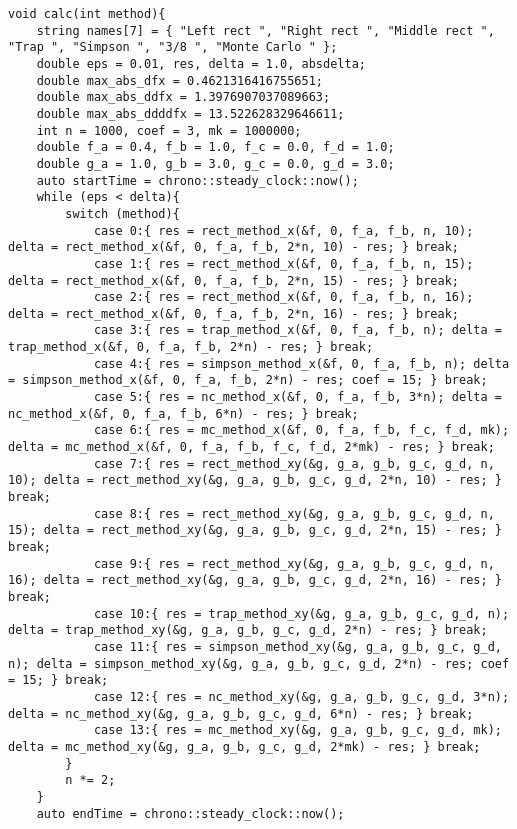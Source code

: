 \documentclass{article}
\begin{document}
\begin{lstlisting}
void calc(int method){
    string names[7] = { "Left rect ", "Right rect ", "Middle rect ", "Trap ", "Simpson ", "3/8 ", "Monte Carlo " };
    double eps = 0.01, res, delta = 1.0, absdelta;
    double max_abs_dfx = 0.4621316416755651;
    double max_abs_ddfx = 1.3976907037089663;
    double max_abs_ddddfx = 13.522628329646611;
    int n = 1000, coef = 3, mk = 1000000;
    double f_a = 0.4, f_b = 1.0, f_c = 0.0, f_d = 1.0;
    double g_a = 1.0, g_b = 3.0, g_c = 0.0, g_d = 3.0;
    auto startTime = chrono::steady_clock::now();
    while (eps < delta){
        switch (method){
            case 0:{ res = rect_method_x(&f, 0, f_a, f_b, n, 10); delta = rect_method_x(&f, 0, f_a, f_b, 2*n, 10) - res; } break;
            case 1:{ res = rect_method_x(&f, 0, f_a, f_b, n, 15); delta = rect_method_x(&f, 0, f_a, f_b, 2*n, 15) - res; } break;
            case 2:{ res = rect_method_x(&f, 0, f_a, f_b, n, 16); delta = rect_method_x(&f, 0, f_a, f_b, 2*n, 16) - res; } break;
            case 3:{ res = trap_method_x(&f, 0, f_a, f_b, n); delta = trap_method_x(&f, 0, f_a, f_b, 2*n) - res; } break;
            case 4:{ res = simpson_method_x(&f, 0, f_a, f_b, n); delta = simpson_method_x(&f, 0, f_a, f_b, 2*n) - res; coef = 15; } break;
            case 5:{ res = nc_method_x(&f, 0, f_a, f_b, 3*n); delta = nc_method_x(&f, 0, f_a, f_b, 6*n) - res; } break;
            case 6:{ res = mc_method_x(&f, 0, f_a, f_b, f_c, f_d, mk); delta = mc_method_x(&f, 0, f_a, f_b, f_c, f_d, 2*mk) - res; } break;
            case 7:{ res = rect_method_xy(&g, g_a, g_b, g_c, g_d, n, 10); delta = rect_method_xy(&g, g_a, g_b, g_c, g_d, 2*n, 10) - res; } break;
            case 8:{ res = rect_method_xy(&g, g_a, g_b, g_c, g_d, n, 15); delta = rect_method_xy(&g, g_a, g_b, g_c, g_d, 2*n, 15) - res; } break;
            case 9:{ res = rect_method_xy(&g, g_a, g_b, g_c, g_d, n, 16); delta = rect_method_xy(&g, g_a, g_b, g_c, g_d, 2*n, 16) - res; } break;
            case 10:{ res = trap_method_xy(&g, g_a, g_b, g_c, g_d, n); delta = trap_method_xy(&g, g_a, g_b, g_c, g_d, 2*n) - res; } break;
            case 11:{ res = simpson_method_xy(&g, g_a, g_b, g_c, g_d, n); delta = simpson_method_xy(&g, g_a, g_b, g_c, g_d, 2*n) - res; coef = 15; } break;
            case 12:{ res = nc_method_xy(&g, g_a, g_b, g_c, g_d, 3*n); delta = nc_method_xy(&g, g_a, g_b, g_c, g_d, 6*n) - res; } break;
            case 13:{ res = mc_method_xy(&g, g_a, g_b, g_c, g_d, mk); delta = mc_method_xy(&g, g_a, g_b, g_c, g_d, 2*mk) - res; } break;
        }
        n *= 2;
    }
    auto endTime = chrono::steady_clock::now();

\end{lstlisting}
\end{document}

